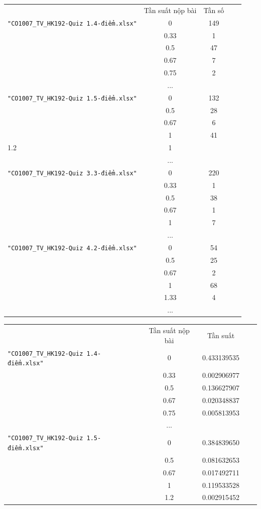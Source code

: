 \documentclass[a4paper]{article}
\theoremstyle{definition}
\begin{document}
\begin{enumerate}[a)]
\begin{itemize}
\begin{itemize}
\begin{center}
\begin{tabular}{l c c c c}
                     & Tần suất nộp bài & Tần số\\
                     \texttt{"CO1007\_TV\_HK192-Quiz 1.4-điểm.xlsx"} & 0 & 149 \\ & 0.33 & 1 \\ & 0.5 & 47 \\ & 0.67 & 7 \\ & 0.75 & 2\\
                     & ...\\
                     \texttt{"CO1007\_TV\_HK192-Quiz 1.5-điểm.xlsx"} & 0 & 132 \\ & 0.5 & 28 \\ & 0.67 & 6 \\ & 1 & 41 & \\ 1.2 & 1\\
                     & ...\\
                     \texttt{"CO1007\_TV\_HK192-Quiz 3.3-điểm.xlsx"} & 0 & 220 \\ & 0.33 & 1 \\ & 0.5 & 38 \\ & 0.67 & 1 \\ & 1 & 7\\
                     & ...\\
                     \texttt{"CO1007\_TV\_HK192-Quiz 4.2-điểm.xlsx"} & 0 & 54 \\ & 0.5 & 25 \\ & 0.67 & 2 \\ & 1 & 68 \\ & 1.33 & 4\\
                     & ...
                \end{tabular}
            \end{center}
            \begin{center}
                \begin{tabular}{l c c c c}
                     & Tần suất nộp bài & Tần suất\\
                     \texttt{"CO1007\_TV\_HK192-Quiz 1.4-điểm.xlsx"} & 0 & 0.433139535 \\ & 0.33 & 0.002906977 \\ & 0.5 & 0.136627907 \\ & 0.67 & 0.020348837 \\ & 0.75 & 0.005813953\\
                     & ...\\
                     \texttt{"CO1007\_TV\_HK192-Quiz 1.5-điểm.xlsx"} & 0 & 0.384839650 \\ & 0.5 & 0.081632653 \\ & 0.67 & 0.017492711 \\ & 1 & 0.119533528 \\ & 1.2 & 0.002915452\\

\end{tabular}
\end{center}
\end{itemize}
\end{itemize}
\end{enumerate}
\end{document}
